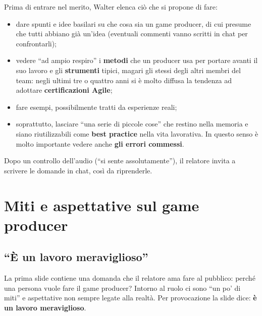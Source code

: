 Prima di entrare nel merito, Walter elenca ciò che si propone di fare:
\begin{itemize}
  \item dare spunti e idee basilari su che cosa sia un game producer, di cui
        presume che tutti abbiano già un'idea (eventuali commenti vanno scritti
        in chat per confrontarli);
  \item vedere ``ad ampio respiro'' i \textbf{metodi} che un producer usa per
        portare avanti il suo lavoro e gli \textbf{strumenti} tipici, magari
        gli stessi degli altri membri del team: negli ultimi tre o quattro anni
        si è molto diffusa la tendenza ad adottare \textbf{certificazioni
        Agile};
  \item fare esempi, possibilmente tratti da esperienze reali;
  \item soprattutto, lasciare ``una serie di piccole cose'' che restino nella
        memoria e siano riutilizzabili come \textbf{best practice} nella vita
        lavorativa. In questo senso è molto importante vedere anche \textbf{gli
        errori commessi}.
\end{itemize}
Dopo un controllo dell'audio (``si sente assolutamente''), il relatore invita a
scrivere le domande in chat, così da riprenderle.

\section{Miti e aspettative sul game producer}
\label{sec:z5-miti}

\subsection{``È un lavoro meraviglioso''}

La prima slide contiene una domanda che il relatore ama fare al pubblico: perché
una persona vuole fare il game producer? Intorno al ruolo ci sono ``un po' di
miti'' e aspettative non sempre legate alla realtà. Per provocazione la slide
dice: \textbf{è un lavoro meraviglioso}.


